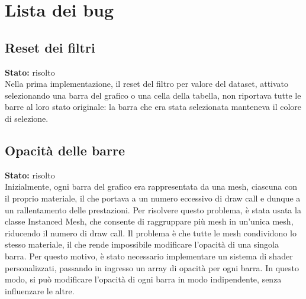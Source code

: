 \section{Lista dei bug}
\subsection{Reset dei filtri}
\textbf{Stato:} risolto\\
Nella prima implementazione, il reset del filtro per valore del dataset,
attivato selezionando una barra del grafico o una cella della tabella,
non riportava tutte le barre al loro stato originale: la barra che era
stata selezionata manteneva il colore di selezione.

\subsection{Opacità delle barre}
\textbf{Stato:} risolto\\
Inizialmente, ogni barra del grafico era rappresentata da una mesh, ciascuna
con il proprio materiale, il che portava a un numero eccessivo di draw call e
dunque a un rallentamento delle prestazioni. 
Per risolvere questo problema, è stata usata la classe Instanced Mesh, che consente di
raggruppare più mesh in un'unica mesh, riducendo il numero di draw call.
Il problema è che tutte le mesh condividono lo stesso materiale, il che rende
impossibile modificare l'opacità di una singola barra. Per questo motivo,
è stato necessario implementare un sistema di shader personalizzati, passando
in ingresso un array di opacità per ogni barra. In questo modo, si può
modificare l'opacità di ogni barra in modo indipendente, senza influenzare le altre.

